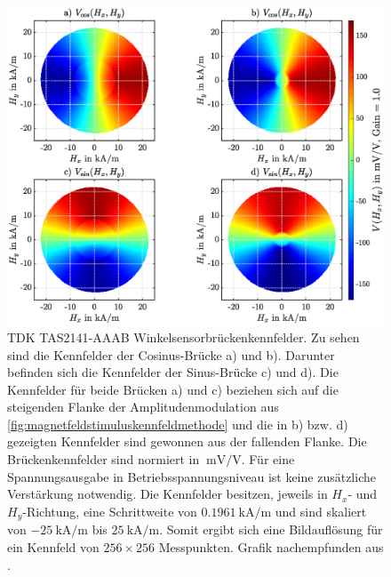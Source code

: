 	
	\clearpage
	\begin{figure}
		\centering
		\includegraphics[width=\linewidth]{chapters/images/TDK_Kennfelder}
		\caption[TDK TAS2141-AAAB Winkelsensorbrückenkennfelder]{TDK TAS2141-AAAB Winkelsensorbrückenkennfelder. Zu 
		sehen sind die Kennfelder der Cosinus-Brücke a) und b). Darunter befinden sich die Kennfelder der Sinus-Brücke 
		c) und d). Die Kennfelder für beide Brücken a) und c) beziehen sich auf die steigenden Flanke der 
		Amplitudenmodulation aus \autoref{fig:magnetfeldstimuluskennfeldmethode} und die in b) bzw. d) gezeigten 
		Kennfelder sind gewonnen aus der fallenden Flanke. Die Brückenkennfelder sind normiert in 
		$\SI{}{\milli\volt\per\volt}$. Für eine Spannungsausgabe in Betriebsspannungsniveau ist keine zusätzliche 
		Verstärkung notwendig. Die Kennfelder besitzen, jeweils in $H_x$- und $H_y$-Richtung, eine Schrittweite von 
		$\SI{0.1961}{\kilo\ampere\per\metre}$ und sind skaliert von $\SI{-25}{\kilo\ampere\per\metre}$ bis 
		$\SI{+25}{\kilo\ampere\per\metre}$. Somit ergibt sich eine Bildauflösung für ein Kennfeld von $256 \times 256$ 
		Messpunkten. Grafik nachempfunden aus \cite{Schuethe2019}.}
		\label{fig:tdkkennfelder}
	\end{figure}
	

